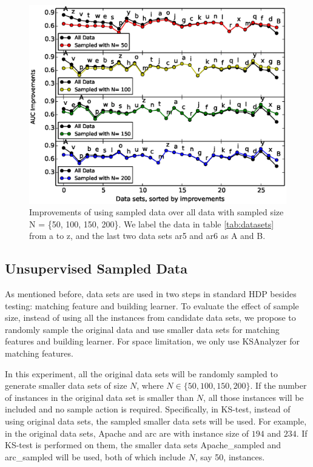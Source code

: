 \begin{figure}[!htp]
	\centering
	\includegraphics[width=\linewidth]{Figures/raleigh/sample_random.eps}
	\caption{Improvements of using sampled data over all data with sampled size N = \{50, 100, 150, 200\}. We label the data in table \ref{tab:datasets} from a to z, and the last two data sets ar5 and ar6 as A and B.}
	\label{fig:small_data}
\end{figure}

\subsection{Unsupervised Sampled Data}
\label{sec:small}

As mentioned before, data sets are used in two steps in standard HDP besides testing: matching feature and building learner. To evaluate the effect of sample size, instead of using all the instances from candidate data sets, we propose to randomly sample the original data and use smaller data sets for matching features and building learner. For space limitation, we only use KSAnalyzer for matching features.

In this experiment, all the original data sets will be randomly sampled to generate smaller data sets of size $N$, where $N \in \{50, 100, 150, 200\}$. If the number of instances in the original data set is smaller than $N$, all those instances will be included and no sample action is required. Specifically, in KS-test, instead of using original data sets, the sampled smaller data sets will be used. For example, in the original data sets, Apache and arc are with instance size of $194$ and $234$. If KS-test is performed on them, the smaller data sets Apache\_sampled and arc\_sampled will be used, both of which include $N$, say 50, instances. 

